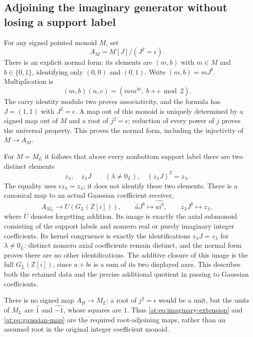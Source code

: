 \documentclass[11pt,a4paper]{article}
\theoremstyle{definition}\newtheorem{definition}[theorem]{Definition}
\newcommand{\Z}{\mathbb Z}\newcommand{\Q}{\mathbb Q}
\begin{document}
\subsection{Adjoining the imaginary generator without losing a support label}

For any signed pointed monoid $M$, set
\[
 A_M=M[J]/(J^2=\epsilon).
 \tag{AT5}\label{at:eq:imaginary-extension}
\]
There is an explicit normal form: its elements are $(m,b)$ with
$m\in M$ and $b\in\{0,1\}$, identifying only $(0,0)$ and
$(0,1)$. Write $(m,b)=mJ^b$. Multiplication is
\[
 (m,b)(n,c)=(mn\epsilon^{bc},\ b+c\bmod2).
 \tag{AT6}\label{at:eq:normal-product}
\]
The carry identity modulo two proves associativity, and the
formula has $J=(1,1)$ with $J^2=\epsilon$. A map out of this
monoid is uniquely determined by a signed map out of $M$ and
a root of $j^2=\epsilon$; reduction of every power of $j$ proves
the universal property. This proves the normal form, including
the injectivity of $M\to A_M$.

For $M=M_L$ it follows that above every nonbottom support label
there are two distinct elements
\[
 z_\lambda,\quad z_\lambda J\qquad(\lambda\ne0_L),
 \quad (z_\lambda J)^2=z_\lambda.
 \tag{AT7}\label{at:eq:support-tags}
\]
The equality uses $\epsilon z_\lambda=z_\lambda$; it does not
identify these two elements. There is a canonical map to an
actual Gaussian coefficient receiver,
\[
 A_{M_L}\longrightarrow U(G_L(\Z[i])),\qquad
 \widehat aJ^b\longmapsto\widehat{ai^b},\qquad
 z_\lambda J^b\longmapsto z_\lambda,
 \tag{AT8}\label{at:eq:gaussian-map}
\]
where $U$ denotes forgetting addition. Its image is exactly the
axial submonoid consisting of the support labels and nonzero real
or purely imaginary integer coefficients. Its kernel congruence
is exactly the identifications $z_\lambda J=z_\lambda$ for
$\lambda\ne0_L$: distinct nonzero axial coefficients remain
distinct, and the normal form proves there are no other
identifications. The additive closure of this image is the full
$G_L(\Z[i])$, since $a+bi$ is a sum of its two displayed axes.
This describes both the retained data and the precise additional
quotient in passing to Gaussian coefficients.

There is no signed map $A_B\to M_L$: a root of $j^2=\epsilon$
would be a unit, but the units of $M_L$ are $\widehat1$ and
$\widehat{-1}$, whose squares are $1$. Thus
\eqref{at:eq:imaginary-extension} and \eqref{at:eq:gaussian-map}
are the required root-adjoining maps, rather than an assumed
root in the original integer coefficient monoid.
\end{document}
